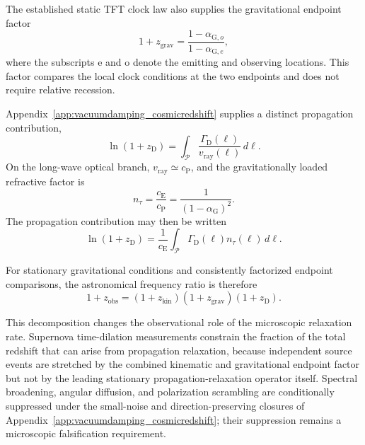 The established static TFT clock law also supplies the gravitational endpoint
factor
\begin{equation}
    1+z_{\mathrm{grav}}
    =
    \frac{
        1-\alpha_{\mathrm G,o}
    }{
        1-\alpha_{\mathrm G,e}
    },
\end{equation}
where the subscripts \(\mathrm e\) and \(\mathrm o\) denote the emitting and
observing locations. This factor compares the local clock conditions at the
two endpoints and does not require relative recession.

Appendix~\ref{app:vacuumdamping_cosmicredshift} supplies a distinct
propagation contribution,
\begin{equation}
    \ln(1+z_{\mathrm D})
    =
    \int_{\mathcal P}
    \frac{
        \Gamma_{\mathrm D}(\ell)
    }{
        v_{\mathrm{ray}}(\ell)
    }
    \,d\ell.
\end{equation}
On the long-wave optical branch,
\(v_{\mathrm{ray}}\simeq c_{\mathrm P}\), and the gravitationally loaded
refractive factor is
\begin{equation}
    n_\tau
    =
    \frac{c_{\mathrm E}}{c_{\mathrm P}}
    =
    \frac{1}{
        (1-\alpha_{\mathrm G})^{2}
    }.
\end{equation}
The propagation contribution may then be written
\begin{equation}
    \ln(1+z_{\mathrm D})
    =
    \frac{1}{c_{\mathrm E}}
    \int_{\mathcal P}
    \Gamma_{\mathrm D}(\ell)
    n_\tau(\ell)\,d\ell.
\end{equation}

For stationary gravitational conditions and consistently factorized endpoint
comparisons, the astronomical frequency ratio is therefore
\begin{equation}
    \boxed{
    1+z_{\mathrm{obs}}
    =
    (1+z_{\mathrm{kin}})
    (1+z_{\mathrm{grav}})
    (1+z_{\mathrm D}).
    }
\end{equation}

This decomposition changes the observational role of the microscopic
relaxation rate. Supernova time-dilation measurements constrain the fraction
of the total redshift that can arise from propagation relaxation, because
independent source events are stretched by the combined kinematic and
gravitational endpoint factor but not by the leading stationary
propagation-relaxation operator itself. Spectral broadening, angular diffusion,
and polarization scrambling are conditionally suppressed under the
small-noise and direction-preserving closures of
Appendix~\ref{app:vacuumdamping_cosmicredshift}; their suppression remains a
microscopic falsification requirement.

